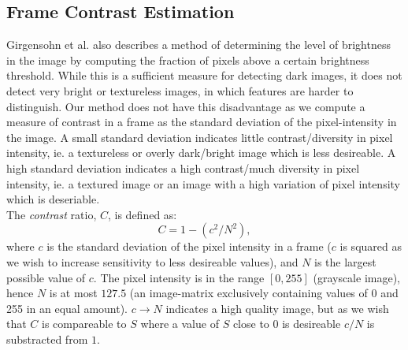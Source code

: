 \subsection{Frame Contrast Estimation}\label{sec:frame_contrast_estimation}
%
Girgensohn et al. \cite{Girgensohn:2000:SAH:354401.354415} also describes a method of determining the level of brightness in the image by computing the fraction of pixels above a certain brightness threshold. While this is a sufficient measure for detecting dark images, it does not detect very bright or textureless images, in which features are harder to distinguish. Our method does not have this disadvantage as we compute a measure of contrast in a frame as the standard deviation of the pixel-intensity in the image.
A small standard deviation indicates little contrast/diversity in pixel intensity, ie. a textureless or overly dark/bright image which is less desireable.
A high standard deviation indicates a high contrast/much diversity in pixel intensity, ie. a textured image or an image with a high variation of pixel intensity which is deseriable.\\
% 
The \textit{contrast} ratio, $C$, is defined as:
\[
C = 1 - (c^2 / N^2),
\]
where $c$ is the standard deviation of the pixel intensity in a frame ($c$ is squared as we wish to increase sensitivity to less desireable values), and $N$ is the largest possible value of $c$. The pixel intensity is in the range $[0,255]$ (grayscale image), hence $N$ is at most $127.5$ (an image-matrix exclusively containing values of 0 and 255 in an equal amount). $c \to N$ indicates a high quality image, but as we wish that $C$ is compareable to $S$ where a value of $S$ close to 0 is desireable $c/N$ is substracted from $1$.\\
%
